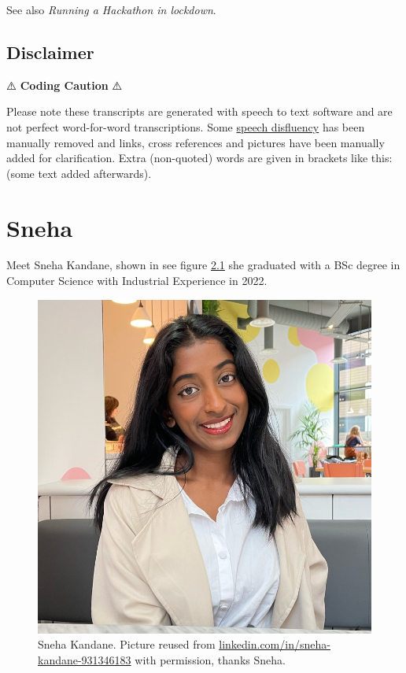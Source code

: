 \documentclass[
]{book}
\begin{document}
See also \emph{Running a Hackathon in lockdown}. \citep{carmen1}

\hypertarget{disclaimer-3}{%
\section{Disclaimer}\label{disclaimer-3}}

⚠️ \textbf{Coding Caution} ⚠️

Please note these transcripts are generated with speech to text software and are not perfect word-for-word transcriptions. Some \href{https://en.wikipedia.org/wiki/Speech_disfluency}{speech disfluency} has been manually removed and links, cross references and pictures have been manually added for clarification. Extra (non-quoted) words are given in brackets like this: (some text added afterwards).

\hypertarget{sneha}{%
\chapter{Sneha}\label{sneha}}

Meet Sneha Kandane, shown in see figure \ref{fig:sneha-fig} she graduated with a BSc degree in Computer Science with Industrial Experience in 2022.

\begin{figure}

{\centering \includegraphics[width=1\linewidth]{images/sneha} 

}

\caption{Sneha Kandane. Picture reused from \href{https://www.linkedin.com/in/sneha-kandane-931346183/}{linkedin.com/in/sneha-kandane-931346183} with permission, thanks Sneha.}\label{fig:sneha-fig}
\end{figure}
\end{document}
